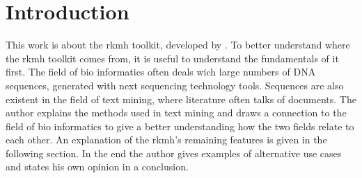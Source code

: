\section{Introduction}

This work is about the rkmh toolkit, developed by \citeauthor{rkmh} \cite{rkmh}. To better understand where the rkmh toolkit comes from, it is useful to understand the fundamentals of it first. The field of bio informatics often deals wich large numbers of DNA sequences, generated with next sequencing technology tools. Sequences are also existent in the field of text mining, where literature often talks of documents. The author explains the methods used in text mining and draws a connection to the field of bio informatics to give a better understanding how the two fields relate to each other. An explanation of the rkmh's remaining features is given in the following section. In the end the author gives examples of alternative use cases and states his own opinion in a conclusion.